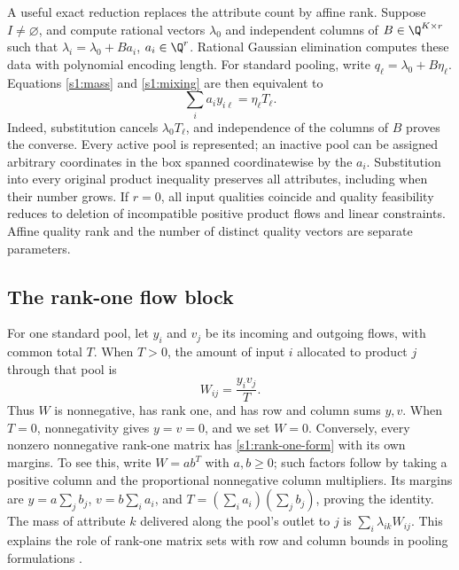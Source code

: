 A useful exact reduction replaces the attribute count by affine rank.
Suppose $I\ne\varnothing$, and compute rational vectors $\lambda_0$ and
independent columns of $B\in\Q^{K\times r}$ such that
$\lambda_i=\lambda_0+Ba_i$, $a_i\in\Q^r$. Rational Gaussian elimination
computes these data with polynomial encoding length. For standard
pooling, write $q_\ell=\lambda_0+B\eta_\ell$. Equations
\eqref{s1:mass} and \eqref{s1:mixing} are then equivalent to
\begin{equation}
 \sum_i a_i y_{i\ell}=\eta_\ell T_\ell.\label{s1:rank-coordinate}
\end{equation}
Indeed, substitution cancels $\lambda_0T_\ell$, and independence of the
columns of $B$ proves the converse. Every active pool is represented;
an inactive pool can be assigned arbitrary coordinates in the box spanned
coordinatewise by the $a_i$. Substitution into every original product
inequality preserves all attributes, including when their number grows.
If $r=0$, all input qualities coincide and quality feasibility reduces
to deletion of incompatible positive product flows and linear constraints.
Affine quality rank and the number of distinct quality vectors are
separate parameters.

\subsection{The rank-one flow block}\label{s1:rank-one}

For one standard pool, let $y_i$ and $v_j$ be its incoming and outgoing
flows, with common total $T$. When $T>0$, the amount of input $i$
allocated to product $j$ through that pool is
\begin{equation}
 W_{ij}=\frac{y_iv_j}{T}.\label{s1:rank-one-form}
\end{equation}
Thus $W$ is nonnegative, has rank one, and has row and column sums $y,v$.
When $T=0$, nonnegativity gives $y=v=0$, and we set $W=0$.
Conversely, every nonzero nonnegative rank-one matrix has
\eqref{s1:rank-one-form} with its own margins. To see this, write
$W=ab^T$ with $a,b\ge0$; such factors follow by taking a positive column
and the proportional nonnegative column multipliers. Its margins are
$y=a\sum_jb_j$, $v=b\sum_i a_i$, and
$T=(\sum_i a_i)(\sum_jb_j)$, proving the identity.
The mass of attribute $k$ delivered along the pool's outlet to $j$ is
$\sum_i\lambda_{ik}W_{ij}$. This explains the role of rank-one matrix
sets with row and column bounds in pooling formulations
\citep{dey2020-convexifications-of-rank-one-based}.

